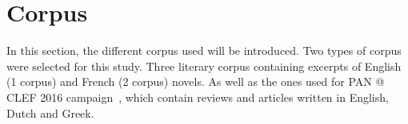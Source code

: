 \section{Corpus \label{sec:corpus}}

In this section, the different corpus used will be introduced.
Two types of corpus were selected for this study.
Three literary corpus containing excerpts of English (1 corpus) and French (2 corpus) novels.
As well as the ones used for PAN @ CLEF 2016 campaign~\cite{pan16}, which contain reviews and articles written in English, Dutch and Greek.



